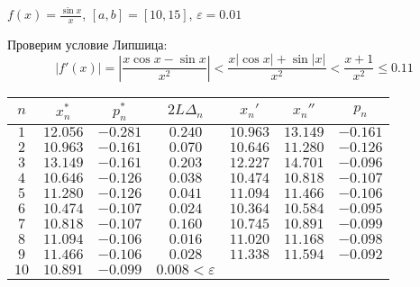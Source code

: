 \begin{example}
    \(f(x) = \frac{\sin x}{x} \), \([a, b] = [10, 15]\), \(\varepsilon = 0.01\)

    Проверим условие Липшица:
    \[|f'(x)| = \left|\frac{x\cos x - \sin x}{x^2} \right| < \frac{x |\cos x| + \sin |x|}{x^2} < \frac{x + 1}{x^2} \leq 0.11\]

    \begin{tabular}{c|c|c|c|c|c|c}
        \(n\)  & \(x_n^*\)  & \(p_n^*\)    & \(2L \Delta_n\)         & \(x_n'\)   & \(x_n''\)  & \(p_n\)      \\ \hline
        \(1\)  & \(12.056\) & \( - 0.281\) & \(0.240\)               & \(10.963\) & \(13.149\) & \( - 0.161\) \\
        \(2\)  & \(10.963\) & \( - 0.161\) & \(0.070\)               & \(10.646\) & \(11.280\) & \( - 0.126\) \\
        \(3\)  & \(13.149\) & \( - 0.161\) & \(0.203\)               & \(12.227\) & \(14.701\) & \( - 0.096\) \\
        \(4\)  & \(10.646\) & \( - 0.126\) & \(0.038\)               & \(10.474\) & \(10.818\) & \( - 0.107\) \\
        \(5\)  & \(11.280\) & \( - 0.126\) & \(0.041\)               & \(11.094\) & \(11.466\) & \( - 0.106\) \\
        \(6\)  & \(10.474\) & \( - 0.107\) & \(0.024\)               & \(10.364\) & \(10.584\) & \( - 0.095\) \\
        \(7\)  & \(10.818\) & \( - 0.107\) & \(0.160\)               & \(10.745\) & \(10.891\) & \( - 0.099\) \\
        \(8\)  & \(11.094\) & \( - 0.106\) & \(0.016\)               & \(11.020\) & \(11.168\) & \( - 0.098\) \\
        \(9\)  & \(11.466\) & \( - 0.106\) & \(0.028\)               & \(11.338\) & \(11.594\) & \( - 0.092\) \\
        \(10\) & \(10.891\) & \( - 0.099\) & \(0.008 < \varepsilon\) &            &            &              \\
    \end{tabular}
\end{example}

